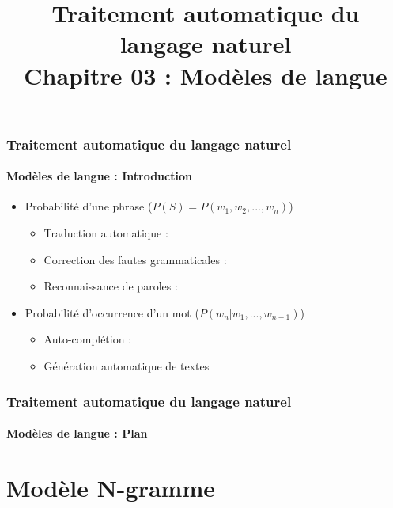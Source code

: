 \documentclass[xcolor=table]{beamer}
\title[TALN : 03- Modèles de langue]%
{Traitement automatique du langage naturel\\Chapitre 03 : Modèles de langue}
\begin{document}
	
\begin{frame}
\frametitle{Traitement automatique du langage naturel}
\framesubtitle{Modèles de langue : Introduction}

\begin{itemize}
	\item Probabilité d'une phrase ($ P(S) = P(w_1, w_2, ..., w_n) $)
	\begin{itemize}
		\item Traduction automatique : \\
		\item Correction des fautes grammaticales : \\
		\item Reconnaissance de paroles : \\
	\end{itemize}
	\item Probabilité d'occurrence d'un mot ($ P(w_n | w_1, ..., w_{n-1}) $)
	\begin{itemize}
		\item Auto-complétion : \\
		\item Génération automatique de textes
	\end{itemize}
\end{itemize}

\end{frame}


\begin{frame}
\frametitle{Traitement automatique du langage naturel}
\framesubtitle{Modèles de langue : Plan}

\begin{multicols}{2}
\tableofcontents
\end{multicols}
\end{frame}

\section{Modèle N-gramme}
\end{document}
